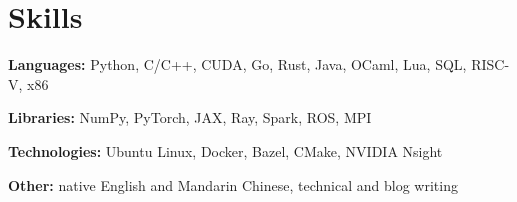 \documentclass[letterpaper,11pt]{article}
\newcommand{\resumeSubHeadingListStart}{\begin{itemize}[leftmargin=0.15in, label={}]}
\newcommand{\resumeSubHeadingListEnd}{\end{itemize}}
\begin{document}








 
\section{Skills}
  \vspace{2pt}
  \resumeSubHeadingListStart
    \small{\item{
        \textbf{Languages: }{Python, C/C++, CUDA, Go, Rust, Java, OCaml, Lua, SQL, RISC-V, x86} \\ \vspace{3pt}
        
        \textbf{Libraries: }{NumPy, PyTorch, JAX, Ray, Spark, ROS, MPI} \\ \vspace{3pt}
        
        \textbf{Technologies: }{Ubuntu Linux, Docker, Bazel, CMake, NVIDIA Nsight} \\ \vspace{3pt}

        \textbf{Other: }{native English and Mandarin Chinese, technical and blog writing}
    }}
  \resumeSubHeadingListEnd
\end{document}
